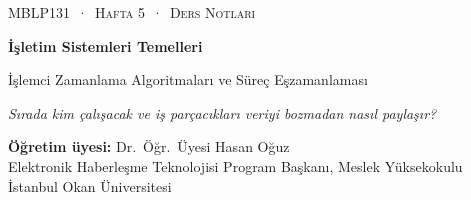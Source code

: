 \documentclass[11pt,a4paper]{article}
\begin{document}
\newcommand{\gantt}[2]{%
\begin{tikzpicture}[x=#1cm,y=1cm]
\foreach \p/\a/\b in {#2} {
  \fill[col\p] (\a,0) rectangle (\b,0.62);
  \draw[white,line width=1.2pt] (\a,0) -- (\a,0.62);
  \node[font=\small\bfseries,text=txt\p] at ({(\a+\b)/2},0.31) {\p};
  \draw[muted] (\a,0) -- (\a,-0.1) node[below,font=\scriptsize,text=muted,inner sep=1.5pt] {\a};
  \draw[muted] (\b,0) -- (\b,-0.1) node[below,font=\scriptsize,text=muted,inner sep=1.5pt] {\b};
}
\end{tikzpicture}}

\thispagestyle{empty}
\begin{tcolorbox}[enhanced,colback=dark,colframe=dark,arc=0pt,boxrule=0pt,
  left=18pt,right=18pt,top=20pt,bottom=20pt,coltext=white]
{\small\color{mint}\textsc{MBLP131 \,·\, Hafta 5 \,·\, Ders Notları}}\par\medskip
{\headfont\fontsize{26}{30}\selectfont\bfseries İşletim Sistemleri Temelleri}\par\medskip
{\large İşlemci Zamanlama Algoritmaları ve Süreç Eşzamanlaması}\par\smallskip
{\small\itshape\color{white!70} Sırada kim çalışacak ve iş parçacıkları veriyi bozmadan nasıl paylaşır?}
\end{tcolorbox}

\vspace{0.4em}
\begin{minipage}[t]{0.70\linewidth}
\small
\textbf{Öğretim üyesi:} Dr.\ Öğr.\ Üyesi Hasan Oğuz\\
Elektronik Haberleşme Teknolojisi Program Başkanı, Meslek Yüksekokulu\\
İstanbul Okan Üniversitesi
\end{minipage}
\end{document}
